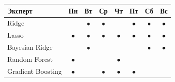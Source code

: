 \begin{tabular}{@{}l*{7}{c}@{}}
\toprule
Эксперт & Пн & Вт & Ср & Чт & Пт & Сб & Вс \\
\midrule
Ridge &  & $\bullet$ & $\bullet$ &  & $\bullet$ & $\bullet$ & $\bullet$ \\
Lasso & $\bullet$ & $\bullet$ & $\bullet$ & $\bullet$ & $\bullet$ & $\bullet$ & $\bullet$ \\
Bayesian Ridge &  & $\bullet$ &  &  &  & $\bullet$ & $\bullet$ \\
Random Forest & $\bullet$ &  &  & $\bullet$ &  &  &  \\
Gradient Boosting & $\bullet$ &  & $\bullet$ & $\bullet$ & $\bullet$ &  &  \\
\bottomrule
\end{tabular}
